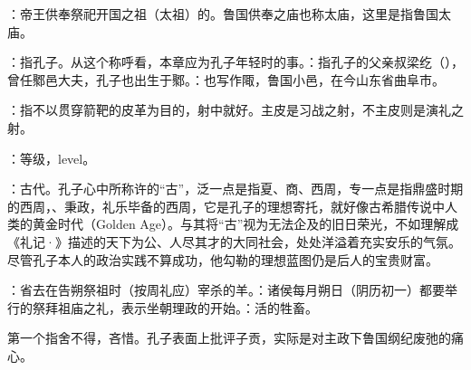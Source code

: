{
\item {}：帝王供奉祭祀开国之祖（太祖）的。鲁国供奉之庙也称太庙，这里是指鲁国太庙。
\item {}：指孔子。从这个称呼看，本章应为孔子年轻时的事。：指孔子的父亲叔梁纥（），曾任鄹邑大夫，孔子也出生于鄹。：也写作陬，鲁国小邑，在今山东省曲阜市。
}
{}


{
\item {}：指不以贯穿箭靶的皮革为目的，射中就好。主皮是习战之射，不主皮则是演礼之射。
\item {}：等级，level。

\item {}：古代。孔子心中所称许的“古”，泛一点是指夏、商、西周，专一点是指鼎盛时期的西周，、秉政，礼乐毕备的西周，它是孔子的理想寄托，就好像古希腊传说中人类的黄金时代（Golden Age）。与其将“古”视为无法企及的旧日荣光，不如理解成《礼记·》描述的天下为公、人尽其才的大同社会，处处洋溢着充实安乐的气氛。尽管孔子本人的政治实践不算成功，他勾勒的理想蓝图仍是后人的宝贵财富。
}
{}  %


{
\item {}：省去在告朔祭祖时（按周礼应）宰杀的羊。：诸侯每月朔日（阴历初一）都要举行的祭拜祖庙之礼，表示坐朝理政的开始。：活的牲畜。 %
\item 第一个指舍不得，吝惜。孔子表面上批评子贡，实际是对主政下鲁国纲纪废弛的痛心。
}
{}



